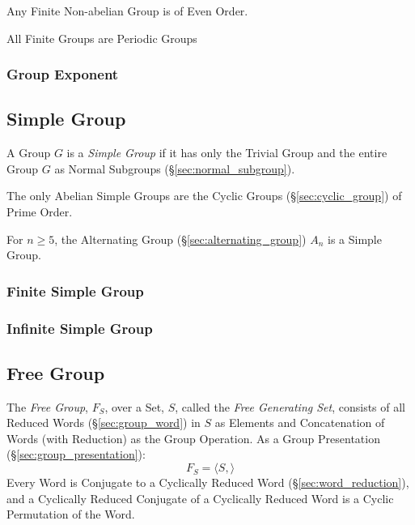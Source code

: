 Any Finite Non-abelian Group is of Even Order.

All Finite Groups are Periodic Groups



\subsubsection{Group Exponent}\label{sec:group_exponent}



\subsection{Simple Group}\label{sec:simple_group}

A Group $G$ is a \emph{Simple Group} if it has only the Trivial Group
and the entire Group $G$ as Normal Subgroups
(\S\ref{sec:normal_subgroup}).

The only Abelian Simple Groups are the Cyclic Groups
(\S\ref{sec:cyclic_group}) of Prime Order.

For $n \geq 5$, the Alternating Group (\S\ref{sec:alternating_group})
$A_n$ is a Simple Group.



\subsubsection{Finite Simple Group}\label{sec:finite_simple_group}

\subsubsection{Infinite Simple Group}\label{sec:infinite_simple_group}



\subsection{Free Group}\label{sec:free_group}

The \emph{Free Group}, $F_S$, over a Set, $S$, called the \emph{Free
  Generating Set}, consists of all Reduced Words
(\S\ref{sec:group_word}) in $S$ as Elements and Concatenation of Words
(with Reduction) as the Group Operation. As a Group Presentation
(\S\ref{sec:group_presentation}):
\[
    F_S = \langle S, \rangle
\]
Every Word is Conjugate to a Cyclically Reduced Word
(\S\ref{sec:word_reduction}), and a Cyclically Reduced Conjugate of a
Cyclically Reduced Word is a Cyclic Permutation of the Word.

